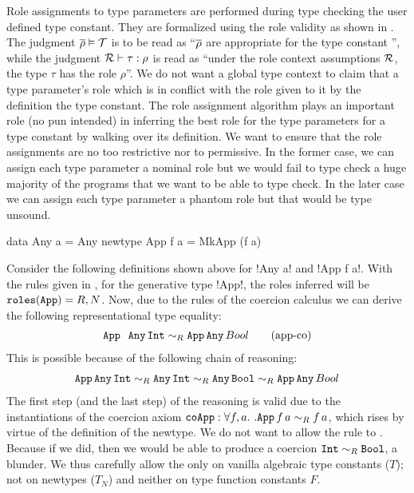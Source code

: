 \documentclass[screen,nonacm]{acmart}
\begin{document}
Role assignments to type parameters are performed during type checking the user defined type constant. They are formalized using the role validity as shown in . The judgment $\overline{\rho} \mathrel{\vDash} \mathcal{T}$ is to be read as ``$\overline{\rho}$ are appropriate for the type constant \TypeConst'', while the judgment $\mathcal{R} \vdash \tau : \rho$ is read as ``under the role context assumptions $\mathcal{R}$, the type $\tau$ has the role $\rho$''. We do not want a global type context to claim that a type parameter's role which is in conflict with the role given to it by the definition the type constant. The role assignment algorithm plays an important role (no pun intended) in inferring the best role for the type parameters for a type constant by walking over its definition. We want to ensure that the role assignments are no too restrictive nor to permissive. In the former case, we can assign each type parameter a nominal role but we would fail to type check a huge majority of the programs that we want to be able to type check. In the later case we can assign each type parameter a phantom role but that would be type unsound.

\begin{CenteredBox}
  \begin{code}
    data Any a = Any
    newtype App f a = MkApp (f a)
  \end{code}
\end{CenteredBox}
Consider the following definitions shown above for !Any a! and !App f a!. With the rules given in , for the generative type !App!, the roles inferred will be $\texttt{roles}(\texttt{App}) = R, N$. Now, due to the rules of the coercion calculus we can derive the following representational type equality:
\begin{align}\label{eqn:app-any-newtype}
  \texttt{App } \, \texttt{Any}\, \texttt{Int} \mathrel{\sim_R} \texttt{App}\,\texttt{Any} \,{Bool}\tag{app-co}
\end{align}
This is possible because of the following chain of reasoning:
\begin{align}
  \texttt{App} \App \texttt{Any}\App \texttt{Int}%
  \teqR \texttt{Any}\App \texttt{Int}%
  \teqR \texttt{Any}\App \texttt{Bool}%
  \teqR \texttt{App}\App\texttt{Any} \App{Bool}\nonumber
\end{align}
The first step (and the last step) of the reasoning is valid due to the instantiations of the coercion axiom $\texttt{coApp} : \forall f, a.~. \texttt{App}\, f\, a \mathrel{\sim_R} f\, a$, which rises by virtue of the definition of the newtype. We do not want to allow the rule  to . Because if we did, then we would be able to produce a coercion $\texttt{Int} \mathrel{\sim_R} \texttt{Bool}$, a blunder. We thus carefully allow the  only on vanilla algebraic type constants ($T$); not on newtypes ($T_N$) and neither on type function constants $F$.
\end{document}
